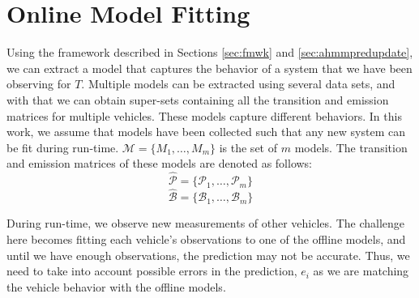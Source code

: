 \documentclass[letterpaper, 10 pt, conference]{ieeeconf}  %
\newcommand\NB[1]{$\spadesuit$\footnote{NB: #1}}
\newcommand\RP[1]{$\clubsuit$\footnote{RP: #1}}
\begin{document}
\section{Online Model Fitting}\label{sec:omf}
Using the framework described in Sections \ref{sec:fmwk} and \ref{sec:ahmmpredupdate}, we can extract a model that captures the behavior of a system that we have been observing for $T$. Multiple models can be extracted using several data sets, and with that we can obtain super-sets containing all the transition and emission matrices for multiple vehicles. These models capture different behaviors. In this work, we assume that models have been collected such that any new system can be fit during run-time. $\mathcal{M} = \{M_1,\ldots,M_m\}$ is the set of $m$ models. %
The transition and emission matrices of these models are denoted as follows: %
\begin{equation}
    \hat{\mathcal{P}} = \{\mathcal{P}_1,\ldots,\mathcal{P}_m\}
\end{equation}
\begin{equation}
    \hat{\mathcal{B}} = \{\mathcal{B}_1,\ldots,\mathcal{B}_{m}\}
\end{equation}


During run-time, we observe new measurements of other vehicles. The challenge here becomes fitting each vehicle's observations to one of the offline models, and until we have enough observations, the prediction may not be accurate. Thus, we need to take into account possible errors in the prediction, $e_i$ as we are matching the vehicle behavior with the offline models. 


\end{document}
